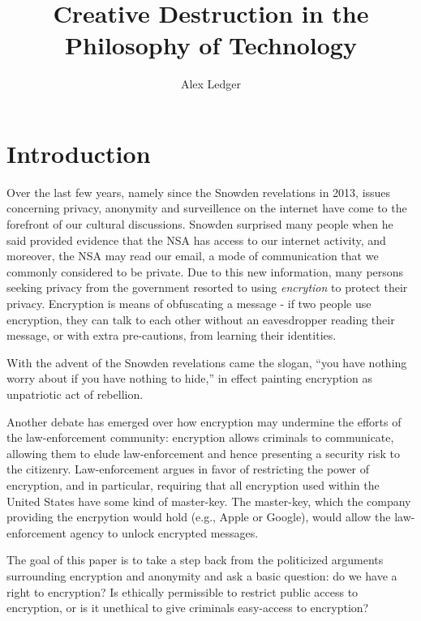 \documentclass[11pt]{article}
\title{Creative Destruction in the Philosophy of Technology}
\author{Alex Ledger}
\date{}
\begin{document}
\doublespacing


\maketitle

\section{Introduction}
Over the last few years, namely since the Snowden revelations in 2013, issues concerning privacy, anonymity and surveillence on the internet have come to the forefront of our cultural discussions.
Snowden surprised many people when he said provided evidence that the NSA has access to our internet activity, and moreover, the NSA may read our email, a mode of communication that we commonly considered to be private.
Due to this new information, many persons seeking privacy from the government resorted to using \textit{encrytion} to protect their privacy.
Encryption is means of obfuscating a message - if two people use encryption, they can talk to each other without an eavesdropper reading their message, or with extra pre-cautions, from learning their identities.

With the advent of the Snowden revelations came the slogan, ``you have nothing worry about if you have nothing to hide,'' in effect painting encryption as unpatriotic act of rebellion.

Another debate has emerged over how encryption may undermine the efforts of the law-enforcement community: encryption allows criminals to communicate, allowing them to elude law-enforcement and hence presenting a security risk to the citizenry.
Law-enforcement argues in favor of restricting the power of encryption, and in particular, requiring that all encryption used within the United States have some kind of master-key.
The master-key, which the company providing the encrpytion would hold (e.g., Apple or Google), would allow the law-enforcement agency to unlock encrypted messages.

The goal of this paper is to take a step back from the politicized arguments surrounding encryption and anonymity and ask a basic question: do we have a right to encryption?
Is ethically permissible to restrict public access to encryption, or is it unethical to give criminals easy-access to encryption?
\end{document}
